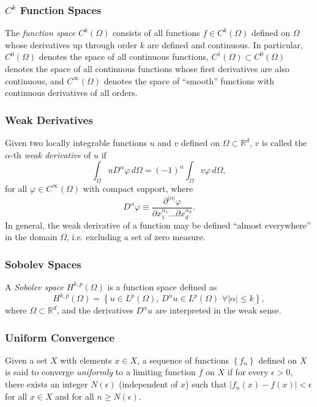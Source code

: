\subsubsection*{$C^k$ Function Spaces} The \textit{function space} $C^k (\Omega)$ consists of all functions $f \in C^k (\Omega)$ defined on $\Omega$ whose derivatives up through order $k$ are defined and continuous. In particular, $C^0 (\Omega)$ denotes the space of all continuous functions, $C^1 (\Omega) \subset C^0 (\Omega)$ denotes the space of all continuous functions whose first derivatives are also continuous, and $C^\infty (\Omega)$ denotes the space of ``smooth'' functions with continuous derivatives of all orders.

\subsubsection*{Weak Derivatives} Given two locally integrable functions $u$ and $v$ defined on $\Omega \subset \mathbb{R}^d$, $v$ is called the $\alpha$-th \textit{weak derivative} of $u$ if
\begin{equation}
  \int_{\Omega} u D^{\alpha} \varphi \, d \Omega = (-1)^{\alpha} \int_{\Omega} v \varphi \, d \Omega,
\end{equation}
for all $\varphi \in C^{\infty} (\Omega)$ with compact support, where
\begin{equation}
  D^{\alpha} \varphi \equiv \frac{\partial^{|\alpha|} \varphi}{\partial x_1^{\alpha_1} \ldots \partial x_d^{\alpha_d}}.
\end{equation}
In general, the weak derivative of a function may be defined ``almost everywhere'' in the domain $\Omega$, i.e. excluding a set of zero measure.

\subsubsection*{Sobolev Spaces} A \textit{Sobolev space} $H^{k,p} (\Omega)$ is a function space defined as
\begin{equation}
  H^{k,p} (\Omega) = \left\{ u \in L^p (\Omega), \, D^{\alpha} u \in L^p (\Omega) \, \, \forall | \alpha | \leq k \right\},
\end{equation}
where $\Omega \subset \mathbb{R}^d$, and the derivatives $D^{\alpha} u$ are interpreted in the weak sense.

\subsubsection*{Uniform Convergence} Given a set $X$ with elements $x \in X$, a sequence of functions $\left\{ f_n \right\}$ defined on $X$ is said to converge \textit{uniformly} to a limiting function $f$ on $X$ if for every $\epsilon > 0$, there exists an integer $N(\epsilon)$ (independent of $x$) such that $|f_n(x) - f(x)| < \epsilon$ for all $x \in X$ and for all $n \geq N(\epsilon)$.